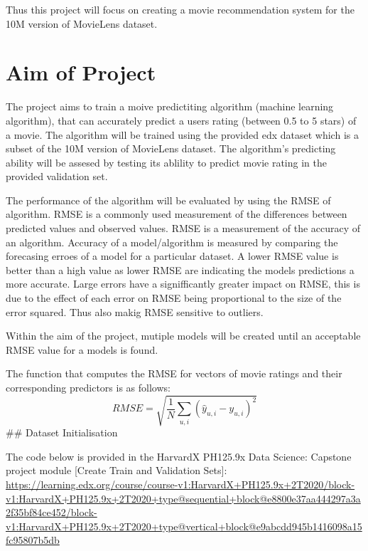 \documentclass[
]{article}
\begin{document}
Thus this project will focus on creating a movie recommendation system
for the 10M version of MovieLens dataset.

\hypertarget{aim-of-project}{%
\section{Aim of Project}\label{aim-of-project}}

The project aims to train a moive predictiting algorithm (machine
learning algorithm), that can accurately predict a users rating (between
0.5 to 5 stars) of a movie. The algorithm will be trained using the
provided edx dataset which is a subset of the 10M version of MovieLens
dataset. The algorithm's predicting ability will be assesed by testing
its ablility to predict movie rating in the provided validation set.

The performance of the algorithm will be evaluated by using the RMSE of
algorithm. RMSE is a commonly used measurement of the differences
between predicted values and observed values. RMSE is a measurement of
the accuracy of an algorithm. Accuracy of a model/algorithm is measured
by comparing the forecasing erroes of a model for a particular dataset.
A lower RMSE value is better than a high value as lower RMSE are
indicating the models predictions a more accurate. Large errors have a
signifficantly greater impact on RMSE, this is due to the effect of each
error on RMSE being proportional to the size of the error squared. Thus
also makig RMSE sensitive to outliers.

Within the aim of the project, mutiple models will be created until an
acceptable RMSE value for a models is found.

The function that computes the RMSE for vectors of movie ratings and
their corresponding predictors is as follows:
\[ RMSE = \sqrt{\frac{1}{N}\displaystyle\sum_{u,i} (\hat{y}_{u,i}-y_{u,i})^{2}} \]
\#\# Dataset Initialisation

The code below is provided in the HarvardX PH125.9x Data Science:
Capstone project module {[}Create Train and Validation Sets{]}:
\url{https://learning.edx.org/course/course-v1:HarvardX+PH125.9x+2T2020/block-v1:HarvardX+PH125.9x+2T2020+type@sequential+block@e8800e37aa444297a3a2f35bf84ce452/block-v1:HarvardX+PH125.9x+2T2020+type@vertical+block@e9abcdd945b1416098a15fc95807b5db}
\end{document}

